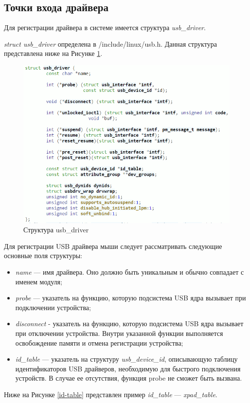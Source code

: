 \subsection{Точки входа драйвера}
Для регистрации драйвера в системе имеется структура \textit{usb\_driver}.

\textit{struct
usb\_driver} определена в /include/linux/usb.h. Данная структура представлена ниже на Рисунке \ref{USB-driver}. 

\begin{figure}[h!]
	\centering
	\includegraphics[scale=0.88]{img/usb-driver.png}
	\caption{Структура usb\_driver}
	\label{USB-driver}
\end{figure}\par
\newpage
Для регистрации USB драйвера мыши следует рассматривать
следующие основные поля структуры:
\begin{itemize}
	\item \textit{name} --- имя драйвера. Оно должно быть уникальным и обычно совпадает с именем модуля;
	\item \textit{probe} --- указатель на функцию, которую подсистема USB ядра вызывает при подключении устройства;
	\item \textit{disconnect} - указатель на функцию, которую подсистема USB ядра вызывает при отключении
	устройства. Внутри указанной функции выполняется освобождение
	памяти и отмена регистрации устройства;
	\item \textit{id\_table} --- указатель на структуру\textit{ usb\_device\_id}, описывающую таблицу
	идентификаторов USB драйверов, необходимую для быстрого
	подключения устройств. В случае ее отсутствия, функция probe не
	сможет быть вызвана.
\end{itemize}\par
Ниже на Рисунке \ref{id-table} представлен пример \textit{id\_table} --- \textit{xpad\_table}.

